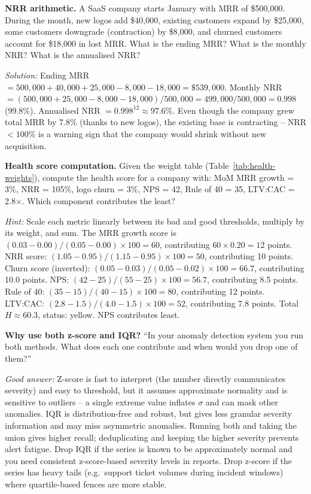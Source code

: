 \begin{challengebox}
\textbf{NRR arithmetic.} A SaaS company starts January with MRR of \$500,000. During the month, new logos add \$40,000, existing customers expand by \$25,000, some customers downgrade (contraction) by \$8,000, and churned customers account for \$18,000 in lost MRR. What is the ending MRR? What is the monthly NRR? What is the annualised NRR?

\smallskip
\textit{Solution:} Ending MRR $= 500{,}000 + 40{,}000 + 25{,}000 - 8{,}000 - 18{,}000 = \$539{,}000$. Monthly NRR $= (500{,}000 + 25{,}000 - 8{,}000 - 18{,}000) / 500{,}000 = 499{,}000 / 500{,}000 = 0.998$ (99.8\%). Annualised NRR $= 0.998^{12} \approx 97.6\%$. Even though the company grew total MRR by 7.8\% (thanks to new logos), the existing base is contracting -- NRR $< 100\%$ is a warning sign that the company would shrink without new acquisition.
\end{challengebox}

\begin{challengebox}
\textbf{Health score computation.} Given the weight table (Table~\ref{tab:health-weights}), compute the health score for a company with: MoM MRR growth = 3\%, NRR = 105\%, logo churn = 3\%, NPS = 42, Rule of 40 = 35, LTV:CAC = 2.8$\times$. Which component contributes the least?

\smallskip
\textit{Hint:} Scale each metric linearly between its bad and good thresholds, multiply by its weight, and sum. The MRR growth score is $(0.03 - 0.00)/(0.05 - 0.00) \times 100 = 60$, contributing $60 \times 0.20 = 12$ points. NRR score: $(1.05 - 0.95)/(1.15 - 0.95) \times 100 = 50$, contributing 10 points. Churn score (inverted): $(0.05 - 0.03)/(0.05 - 0.02) \times 100 = 66.7$, contributing 10.0 points. NPS: $(42 - 25)/(55 - 25) \times 100 = 56.7$, contributing 8.5 points. Rule of 40: $(35 - 15)/(40 - 15) \times 100 = 80$, contributing 12 points. LTV:CAC: $(2.8 - 1.5)/(4.0 - 1.5) \times 100 = 52$, contributing 7.8 points. Total $H \approx 60.3$, status: yellow. NPS contributes least.
\end{challengebox}

\begin{interviewbox}
\textbf{Why use both z-score and IQR?} ``In your anomaly detection system you run both methods. What does each one contribute and when would you drop one of them?''

\smallskip
\textit{Good answer:} Z-score is fast to interpret (the number directly communicates severity) and easy to threshold, but it assumes approximate normality and is sensitive to outliers -- a single extreme value inflates $\sigma$ and can mask other anomalies. IQR is distribution-free and robust, but gives less granular severity information and may miss asymmetric anomalies. Running both and taking the union gives higher recall; deduplicating and keeping the higher severity prevents alert fatigue. Drop IQR if the series is known to be approximately normal and you need consistent z-score-based severity levels in reports. Drop z-score if the series has heavy tails (e.g.\ support ticket volumes during incident windows) where quartile-based fences are more stable.
\end{interviewbox}

